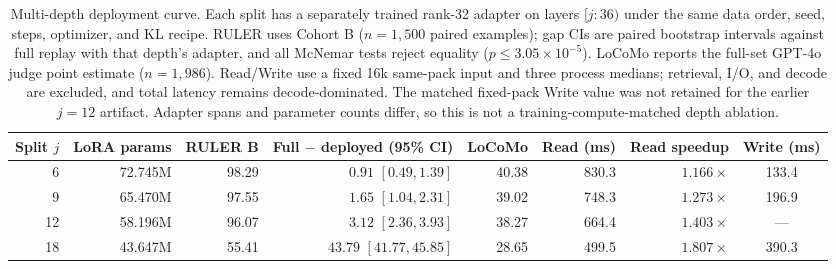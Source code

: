 \begin{table}[!t]
\centering
\scriptsize
\setlength{\tabcolsep}{4pt}
\begin{tabular}{@{}rrrrrrrc@{}}
\toprule
\textbf{Split $j$} & \textbf{LoRA params} & \textbf{RULER B} & \textbf{Full $-$ deployed (95\% CI)} & \textbf{LoCoMo} & \textbf{Read (ms)} & \textbf{Read speedup} & \textbf{Write (ms)} \\
\midrule
6  & 72.745M & 98.29 & $0.91$ $[0.49,1.39]$ & 40.38 & 830.3 & $1.166\times$ & 133.4 \\
9  & 65.470M & 97.55 & $1.65$ $[1.04,2.31]$ & 39.02 & 748.3 & $1.273\times$ & 196.9 \\
12 & 58.196M & 96.07 & $3.12$ $[2.36,3.93]$ & 38.27 & 664.4 & $1.403\times$ & --- \\
18 & 43.647M & 55.41 & $43.79$ $[41.77,45.85]$ & 28.65 & 499.5 & $1.807\times$ & 390.3 \\
\bottomrule
\end{tabular}
\caption{Multi-depth deployment curve. Each split has a separately trained rank-32
adapter on layers $[j{:}36)$ under the same data order, seed, steps, optimizer,
and KL recipe. RULER uses Cohort B ($n{=}1{,}500$ paired examples); gap CIs are
paired bootstrap intervals against full replay with that depth's adapter, and
all McNemar tests reject equality ($p\leq3.05\times10^{-5}$). LoCoMo reports the
full-set GPT-4o judge point estimate ($n{=}1{,}986$). Read/Write use a fixed 16k
same-pack input and three process medians; retrieval, I/O, and decode are
excluded, and total latency remains decode-dominated. The matched fixed-pack
Write value was not retained for the earlier $j{=}12$ artifact. Adapter spans
and parameter counts differ, so this is not a training-compute-matched depth
ablation.}
\label{tab:distilled-depth-curve}
\end{table}
